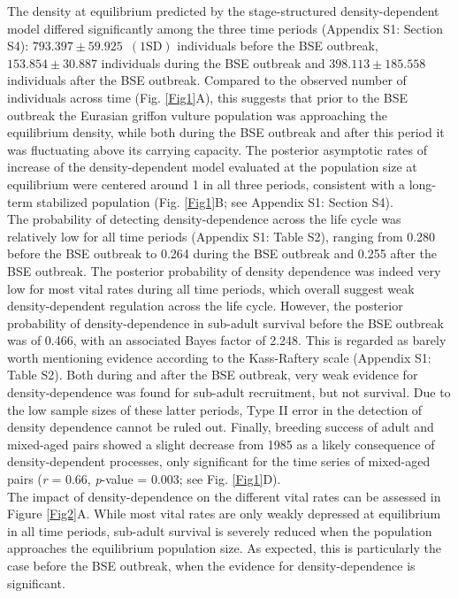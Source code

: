 \documentclass[12pt]{article}
\begin{document}
The density at equilibrium predicted by the stage-structured density-dependent model differed significantly among the three time periods (Appendix S1: Section S4): $ 793.397 \pm 59.925 \enspace (1\text{SD})$ individuals before the BSE outbreak, $ 153.854 \pm 30.887 $ individuals during the BSE outbreak and $ 398.113 \pm 185.558 $ individuals after the BSE outbreak. Compared to the observed number of individuals across time (Fig. \ref{Fig1}A), this suggests that prior to the BSE outbreak the Eurasian griffon vulture population was approaching the equilibrium density, while both during the BSE outbreak and after this period it was fluctuating above its carrying capacity. The posterior asymptotic rates of increase of the density-dependent model evaluated at the population size at equilibrium were centered around 1 in all three periods, consistent with a long-term stabilized population (Fig. \ref{Fig1}B; see Appendix S1: Section S4).  \\

The probability of detecting density-dependence across the life cycle was relatively low for all time periods (Appendix S1: Table S2), ranging from 0.280 before the BSE outbreak to 0.264 during the BSE outbreak and 0.255 after the BSE outbreak. The posterior probability of density dependence was indeed very low for most vital rates during all time periods, which overall suggest weak density-dependent regulation across the life cycle. However, the posterior probability of density-dependence in sub-adult survival before the BSE outbreak was of 0.466, with an associated Bayes factor of 2.248. This is regarded as barely worth mentioning evidence according to the Kass-Raftery scale (Appendix S1: Table S2). Both during and after the BSE outbreak, very weak evidence for density-dependence was found for sub-adult recruitment, but not survival. Due to the low sample sizes of these latter periods, Type II error in the detection of density dependence cannot be ruled out. Finally, breeding success of adult and mixed-aged pairs showed a slight decrease from 1985 as a likely consequence of density-dependent processes, only significant for the time series of mixed-aged pairs (\textit{r} = 0.66, \textit{p}-value = 0.003; see Fig. \ref{Fig1}D). \\

The impact of density-dependence on the different vital rates can be assessed in Figure \ref{Fig2}A. While most vital rates are only weakly depressed at equilibrium in all time periods, sub-adult survival is severely reduced when the population approaches the equilibrium population size. As expected, this is particularly the case before the BSE outbreak, when the evidence for density-dependence is significant.
\end{document}
